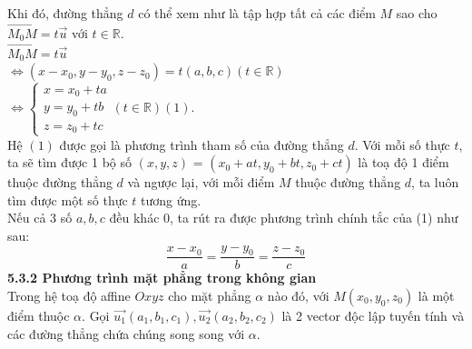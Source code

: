 \documentclass[12pt,a4]{article}
\begin{document}
\begin{titlepage}
\begin{center}
\end{center}
Khi đó, đường thẳng $d$ có thể xem như là tập hợp tất cả các điểm $M$ sao cho $\overrightarrow{M_0M} = t\vec{u}$ với $t \in \mathbb{R}.$\\
$\overrightarrow{M_0M} = t\vec{u}$\\
$\Leftrightarrow (x - x_0, y - y_0, z - z_0) = t(a,b,c) (t \in \mathbb{R})$\\
$\Leftrightarrow \begin{cases} x = x_0 + ta \\ y = y_0 + tb \\ z = z_0 + tc\end{cases} (t \in \mathbb{R}) (1).$\\
Hệ $(1)$ được gọi là phương trình tham số của đường thẳng $d$. Với mỗi số thực $t$, ta sẽ tìm được 1 bộ số $(x,y,z)$ = $(x_0 + at, y_0 + bt, z_0 + ct)$ là toạ độ 1 điểm thuộc đường thẳng $d$ và ngược lại, với mỗi điểm $M$ thuộc đường thẳng $d$, ta luôn tìm được một số thực $t$ tương ứng.\\
Nếu cả 3 số $a,b,c$ đều khác 0, ta rút ra được phương trình chính tắc của (1) như sau:
\[
\frac{x - x_0}{a} = \frac{y - y_0}{b} = \frac{z - z_0}{c}
\]
\vspace{0.2cm}
\textbf{5.3.2 Phương trình mặt phẳng trong không gian}\\
\vspace{0.2cm}
Trong hệ toạ độ affine $Oxyz$ cho mặt phẳng $\alpha$ nào đó, với $M(x_0,y_0,z_0)$ là một điểm thuộc $\alpha$. Gọi $\vec{u_1}(a_1,b_1,c_1),\vec{u_2}(a_2,b_2,c_2)$ là 2 vector độc lập tuyến tính và các đường thẳng chứa chúng song song với $\alpha$.\\
\begin{center}
\end{center}
\end{titlepage}
\end{document}
